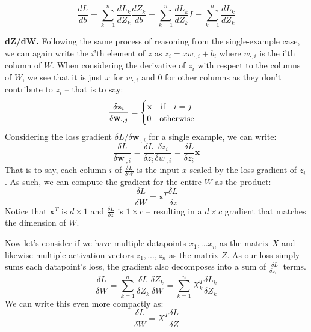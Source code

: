 \documentclass[a4paper,10pt]{article}
\newcommand{\xb}{\mathbf{x}}
\newcommand{\wb}{\mathbf{w}}
\begin{document}
\begin{equation}
    \frac{dL}{db} = \sum_{k=1}^n \frac{dL_k}{dZ_k}\frac{dZ_k}{db} = \sum_{k=1}^n \frac{dL_k}{dZ_k}I = \sum_{k=1}^n \frac{dL_k}{dZ_k} 
    \label{eq:dldb}
\end{equation}

\vspace{10pt}\noindent\textbf{dZ/dW.} Following the same process of reasoning from the single-example case, we can again write the $i$'th element of $z$ as $z_i = xw_{\cdot, i}+b_i$ where $w_{\cdot, i}$ is the i'th column of $W$. When considering the derivative of $z_i$ with respect to the columns of $W$, we see that it is just $x$ for $w_{\cdot, i}$ and 0 for other columns as they don't contribute to $z_i$ -- that is to say:
%
\begin{eqnarray}
\frac{\delta \zb_i}{\delta \wb_{\cdot,j}} = \begin{cases}
    \xb \quad\mbox{if}\quad i=j\\
    0 \quad\mbox{otherwise}
    \end{cases}
\end{eqnarray}
%
Considering the loss gradient $\delta L /\delta \wb_{\cdot, i}$ for a single example, we can write:
%
\begin{equation}
\frac{\delta L}{\delta \wb_{\cdot, i}} = \frac{\delta L}{\delta z_i}\frac{\delta z_i}{\delta w_{\cdot,i}} = \frac{\delta L}{\delta z_i} \mathbf{x}
\end{equation}
%
\noindent That is to say, each column $i$ of $\frac{\delta L}{\delta W}$ is the input $x$ scaled by the loss gradient of $z_i$. As such, we can compute the gradient for the entire $W$ as the product:
%
\begin{equation}
\frac{\delta L}{\delta W} = \mathbf{x}^T\frac{\delta L}{\delta z}
\end{equation}
%
Notice that $\xb^T$ is $d \times 1$ and $\frac{\delta L}{\delta z}$ is $1 \times c$ -- resulting in a $d \times c$ gradient that matches the dimension of $W$.

Now let's consider if we have multiple datapoints $x_1,...x_n$  as the matrix $X$ and likewise multiple activation vectors $z_1, ..., z_n$ as the matrix $Z$. As our loss simply sums each datapoint's loss, the gradient also decomposes into a sum of $\frac{\delta L}{\delta z_{i, \cdot}}$ terms.
%
\begin{equation}
\frac{\delta L}{\delta W} = \sum_{k=1}^n \frac{\delta L}{\delta Z_k}\frac{\delta Z_k}{\delta W} = \sum_{k=1}^n X_{k}^T\frac{\delta L_k}{\delta Z_k}
\end{equation}
%
We can write this even more compactly as:
%
\begin{equation}
\frac{\delta L}{\delta W} = X^T\frac{\delta L}{\delta Z}
\label{eq:dldw}
\end{equation}
\end{document}
